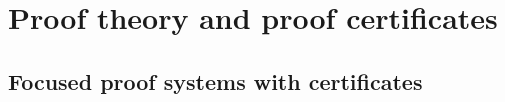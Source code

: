 \section{Proof theory and proof certificates}
\label{sec:three}
  \newcommand{\XXi}{{\color{blue}{\Xi}}}


\subsection{Focused proof systems with certificates}
\label{ssec:focused}




%



